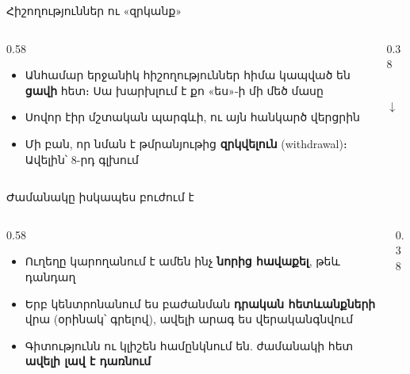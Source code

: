 \begin{frame}{Հիշողություններ ու «զրկանք»}
  \begin{columns}[c]
    \begin{column}{0.58\textwidth}
      \begin{itemize}
        \item Անհամար երջանիկ հիշողություններ հիմա կապված են \textbf{ցավի} հետ։ Սա խարխլում է քո «ես»-ի մի մեծ մասը
        \item<2-> Սովոր էիր մշտական պարգևի, ու այն հանկարծ վերցրին
        \item<3-> Մի բան, որ նման է թմրանյութից \textbf{զրկվելուն} (withdrawal)։ Ավելին՝ 8-րդ գլխում
      \end{itemize}
    \end{column}
    \begin{column}{0.38\textwidth}
      \centering
      \ \ \par\medskip
      {\Large$\downarrow$}\par\medskip
    \end{column}
  \end{columns}
\end{frame}

\begin{frame}{Ժամանակը իսկապես բուժում է}
  \begin{columns}[c]
    \begin{column}{0.58\textwidth}
      \begin{itemize}
        \item Ուղեղը կարողանում է ամեն ինչ \textbf{նորից հավաքել}, թեև դանդաղ
        \item<2-> Երբ կենտրոնանում ես բաժանման \textbf{դրական հետևանքների} վրա (օրինակ՝ գրելով), ավելի արագ ես վերականգնվում
        \item<3-> Գիտությունն ու կլիշեն համընկնում են. ժամանակի հետ \textbf{ավելի լավ է դառնում}
      \end{itemize}
    \end{column}
    \begin{column}{0.38\textwidth}
      \centering
      \par\medskip
    \end{column}
  \end{columns}
\end{frame}
